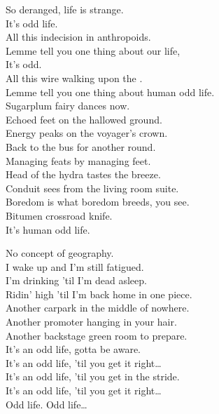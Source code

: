 So deranged, life is strange. \\
It's  odd life. \\

All this indecision in anthropoids. \\
Lemme tell you one thing about our life, \\
It's odd. \\
All this wire walking upon the . \\
Lemme tell you one thing about human odd life. \\

Sugarplum fairy dances now. \\
Echoed feet on the hallowed ground. \\
Energy peaks on the voyager's crown. \\
Back to the bus for another round. \\
Managing feats by managing feet. \\
Head of the hydra tastes the breeze. \\
Conduit sees from the living room suite. \\
Boredom is what boredom breeds, you see. \\

Bitumen crossroad knife. \\
It's human odd life. \\


No concept of geography. \\
I wake up and I'm still fatigued. \\
I'm drinking 'til I'm dead asleep. \\
Ridin' high 'til I'm back home in one piece. \\
Another carpark in the middle of nowhere. \\
Another promoter hanging in your hair. \\
Another backstage green room to prepare. \\
It's an odd life, gotta be aware. \\

It's an odd life, 'til you get it right… \\
It's an odd life, 'til you get in the stride. \\

It's an odd life, 'til you get it right… \\

Odd life. Odd life… \\

